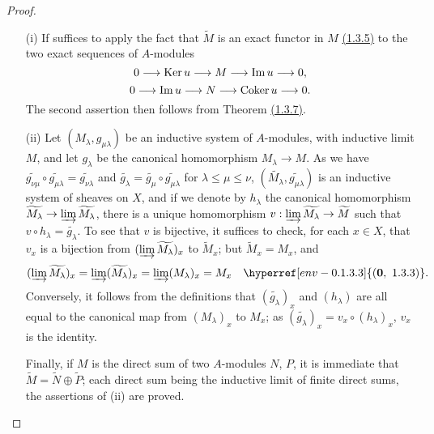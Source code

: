 \begin{proof}
\label{proof-cor-1.1.3.9}
\medskip\noindent
\begin{itemize}
  \item[(i)] If suffices to apply the fact that $\widetilde{M}$ is an exact functor in $M$
        \hyperref[prop-1.1.3.5]{(1.3.5)} to the two exact sequences of $A$-modules
        \[
          0\longrightarrow{\mathop{\mathrm{Ker}}\nolimits}\, u\longrightarrow M\longrightarrow{\mathop{\mathrm{Im}}\nolimits}\, u\longrightarrow 0,
        \]
        \[
          0\longrightarrow{\mathop{\mathrm{Im}}\nolimits}\, u\longrightarrow N\longrightarrow{\mathop{\mathrm{Coker}}\nolimits}\, u\longrightarrow 0.
        \]
        The second assertion then follows from Theorem \hyperref[thm-1.1.3.7]{(1.3.7)}.
  \item[(ii)] Let $(M_\lambda,g_{\mu\lambda})$ be an inductive system of $A$-modules, with
        inductive limit $M$, and let $g_\lambda$ be the canonical homomorphism
        $M_\lambda\to M$. As we have
        $\widetilde{g_{\nu\mu}}\circ\widetilde{g_{\mu\lambda}}=\widetilde{g_{\nu\lambda}}$
        and $\widetilde{g_\lambda}=\widetilde{g_\mu}\circ\widetilde{g_{\mu\lambda}}$ for
        $\lambda\leqslant\mu\leqslant\nu$,
        $(\widetilde{M_\lambda},\widetilde{g_{\mu\lambda}})$ is an inductive system of
        sheaves on $X$, and if we denote by $h_\lambda$ the canonical homomorphism
        $\widetilde{M_\lambda}\to\varinjlim\widetilde{M_\lambda}$, there is a unique
        homomorphism $v:\varinjlim\widetilde{M_\lambda}\to\widetilde{M}$ such that
        $v\circ h_\lambda=\widetilde{g_\lambda}$. To see that $v$ is bijective, it suffices
        to check, for each $x\in X$, that $v_x$ is a bijection from
        $(\varinjlim\widetilde{M_\lambda})_x$ to $\widetilde{M}_x$; but
        $\widetilde{M}_x=M_x$, and
        \[
          (\varinjlim\widetilde{M_\lambda})_x=\varinjlim(\widetilde{M_\lambda})_x
          =\varinjlim(M_\lambda)_x=M_x\quad\hyperref[env-0.1.3.3]{(\textbf{0},~1.3.3)}.
        \]
        Conversely, it follows from the definitions that $(\widetilde{g_\lambda})_x$ and
        $(h_\lambda)$ are all equal to the canonical map from $(M_\lambda)_x$ to $M_x$; as
        $(\widetilde{g_\lambda})_x=v_x\circ(h_\lambda)_x$, $v_x$ is the identity.

        Finally, if $M$ is the direct sum of two $A$-modules $N$, $P$, it is immediate that
        $\widetilde{M}=\widetilde{N}\oplus\widetilde{P}$; each direct sum being the inductive
        limit of finite direct sums, the assertions of (ii) are proved.
\end{itemize}
\end{proof}

